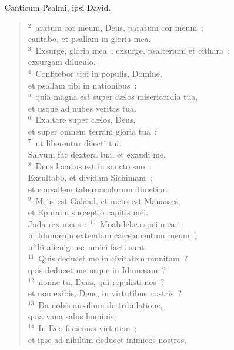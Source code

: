 \bchapter[Psalm]
Canticum Psalmi, ipsi David.
\begin{verse}${}^{2}$~aratum cor meum, Deus, paratum cor meum~;\\ cantabo, et psallam in gloria mea.\\
${}^{3}$~Exsurge, gloria mea~; exsurge, psalterium et cithara~;\\ exsurgam diluculo.\\
${}^{4}$~Confitebor tibi in populis, Domine,\\ et psallam tibi in nationibus~:\\
${}^{5}$~quia magna est super c\ae los misericordia tua,\\ et usque ad nubes veritas tua.\\
${}^{6}$~Exaltare super c\ae los, Deus,\\ et super omnem terram gloria tua~:\\
${}^{7}$~ut liberentur dilecti tui.\\ Salvum fac dextera tua, et exaudi me.\\
${}^{8}$~Deus locutus est in sancto suo~:\\ Exsultabo, et dividam Sichimam~;\\ et convallem tabernaculorum dimetiar.\\
${}^{9}$~Meus est Galaad, et meus est Manasses,\\ et Ephraim susceptio capitis mei.\\ Juda rex meus~;
${}^{10}$~Moab lebes spei me\ae~:\\ in Idum\ae am extendam calceamentum meum~;\\ mihi alienigen\ae\ amici facti sunt.\\
${}^{11}$~Quis deducet me in civitatem munitam~?\\ quis deducet me usque in Idum\ae am~?\\
${}^{12}$~nonne tu, Deus, qui repulisti nos~?\\ et non exibis, Deus, in virtutibus nostris~?\\
${}^{13}$~Da nobis auxilium de tribulatione,\\ quia vana salus hominis.\\
${}^{14}$~In Deo faciemus virtutem~;\\ et ipse ad nihilum deducet inimicos nostros.\end{verse}



